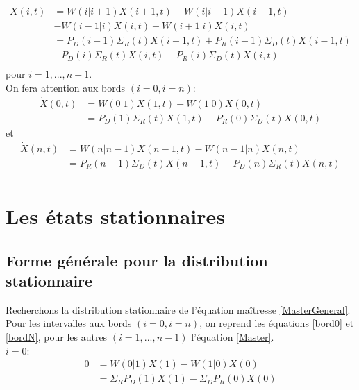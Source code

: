 \begin{equation}
\begin{aligned}
\dot{X}(i,t)&= W(i|i+1) X(i+1,t) + W(i|i-1) X(i-1,t)\\
					&-W(i-1|i) X(i,t) -W(i+1|i) X(i,t)\\
		    &= P_D(i+1) \Sigma_R(t) X(i+1,t) + P_R(i-1) \Sigma_D(t) X(i-1,t)\\
					&-P_D(i) \Sigma_R(t) X(i,t) -P_R(i) \Sigma_D(t) X(i,t)\\
\label{Master}
\end{aligned}
\end{equation}
pour $i = 1,...,n-1$.\\

On fera attention aux bords $(i=0, i=n)$:
\begin{equation}
\begin{aligned}
\dot{X}(0,t) 	&= W(0|1) X(1,t) - W(1|0) X(0,t)\\
				&= P_D(1) \Sigma_R(t) X(1,t) - P_R(0) \Sigma_D(t) X(0,t)
\label{bord0}
\end{aligned}
\end{equation}
 et 
\begin{equation}
\begin{aligned}
\dot{X}(n,t) 	&= W(n|n-1) X(n-1,t) - W(n-1|n) X(n,t)\\
				&= P_R(n-1) \Sigma_D(t) X(n-1,t)- P_D(n) \Sigma_R(t) X(n,t)\\
\label{bordN}
\end{aligned}
\end{equation}


\section{Les états stationnaires}

\subsection{Forme générale pour la distribution stationnaire}
Recherchons la distribution stationnaire de l'équation maîtresse \ref{MasterGeneral}.\\

Pour les intervalles aux bords $(i=0,i=n)$, on reprend les équations \ref{bord0} et \ref{bordN}, pour les autres $(i=1,...,n-1)$ l'équation \ref{Master}.\\

$i=0$:
\begin{equation}
\begin{aligned}
0 &= W(0|1) X(1) - W(1|0) X(0)\\
  &= \Sigma_R P_D(1) X(1)- \Sigma_D P_R(0) X(0)\\
\label{statio_1}
\end{aligned}
\end{equation}

